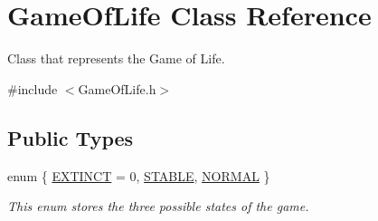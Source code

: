 \hypertarget{classGameOfLife}{}\section{Game\+Of\+Life Class Reference}
\label{classGameOfLife}


Class that represents the Game of Life.  




{\ttfamily \#include $<$Game\+Of\+Life.\+h$>$}

\subsection*{Public Types}
\begin{DoxyCompactItemize}
\item 
enum \{ \hyperlink{classGameOfLife_ab9119586dc592398cd982530e3076831aa42b4c2d9a4b12ea3bf81060bc781e43}{E\+X\+T\+I\+N\+CT} = 0, 
\hyperlink{classGameOfLife_ab9119586dc592398cd982530e3076831afcc170e6cce7f91ad0995193873ef5a7}{S\+T\+A\+B\+LE}, 
\hyperlink{classGameOfLife_ab9119586dc592398cd982530e3076831adb669df0cff6f0440837322bfc241081}{N\+O\+R\+M\+AL}
 \}\begin{DoxyCompactList}\small\item\em This enum stores the three possible states of the game. \end{DoxyCompactList}
\end{DoxyCompactItemize}
